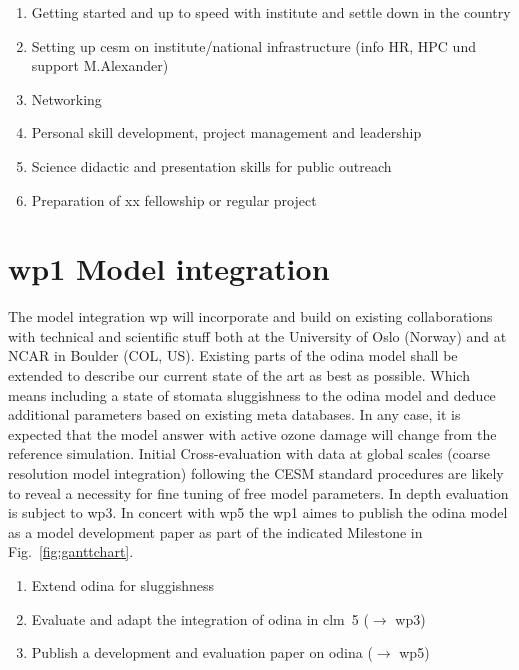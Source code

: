 \begin{enumerate}[start=1,label={T0.\arabic*:}]
  \itemsep0pt
\item Getting started and up to speed with institute and settle down in the country
\item Setting up \gls{cesm} on institute/national infrastructure (info HR, HPC und support M.Alexander)
\item Networking
\item Personal skill development, project management and leadership
\item Science didactic and presentation skills for public outreach
\item Preparation of xx fellowship or regular project 
\end{enumerate}

\section*{\gls{wp}1 Model integration}
\label{ssec:wp1}
The model integration \gls{wp} will incorporate and build on existing collaborations with technical and scientific stuff both at the University of Oslo (Norway) and at NCAR in Boulder (COL, US). Existing parts of the \gls{odina} model shall be extended to describe our current state of the art as best as possible. Which means including a state of stomata sluggishness to the \gls{odina} model and deduce additional parameters based on existing meta databases. In any case, it is expected that the model answer with active ozone damage will change from the reference simulation. Initial Cross-evaluation with data at global scales (coarse resolution model integration) following the CESM standard procedures are likely to reveal a necessity for fine tuning of free model parameters. In depth evaluation is subject to \gls{wp}3. In concert with \gls{wp}5 the \gls{wp}1 aimes to publish the \gls{odina} model as a model development paper as part of the indicated Milestone in Fig.~\ref{fig:ganttchart}.

\begin{enumerate}[start=1,label={T1.\arabic*:}]
  \itemsep0pt
\item Extend \gls{odina} for sluggishness  
\item Evaluate and adapt the integration of \gls{odina} in \gls{clm}~5 ($\rightarrow$ \gls{wp}3)
\item Publish a development and evaluation paper on \gls{odina} ($\rightarrow$ \gls{wp}5)
\end{enumerate}

